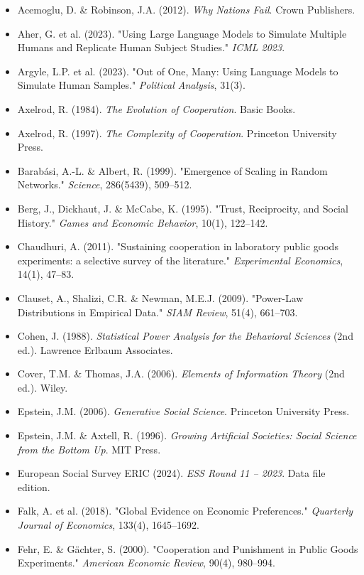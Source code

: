 \begin{itemize}
\item Acemoglu, D. \& Robinson, J.A. (2012). \textit{Why Nations Fail}. Crown Publishers.
\item Aher, G. et al. (2023). "Using Large Language Models to Simulate Multiple Humans and Replicate Human Subject Studies." \textit{ICML 2023}.
\item Argyle, L.P. et al. (2023). "Out of One, Many: Using Language Models to Simulate Human Samples." \textit{Political Analysis}, 31(3).
\item Axelrod, R. (1984). \textit{The Evolution of Cooperation}. Basic Books.
\item Axelrod, R. (1997). \textit{The Complexity of Cooperation}. Princeton University Press.
\item Barabási, A.-L. \& Albert, R. (1999). "Emergence of Scaling in Random Networks." \textit{Science}, 286(5439), 509–512.
\item Berg, J., Dickhaut, J. \& McCabe, K. (1995). "Trust, Reciprocity, and Social History." \textit{Games and Economic Behavior}, 10(1), 122–142.
\item Chaudhuri, A. (2011). "Sustaining cooperation in laboratory public goods experiments: a selective survey of the literature." \textit{Experimental Economics}, 14(1), 47–83.
\item Clauset, A., Shalizi, C.R. \& Newman, M.E.J. (2009). "Power-Law Distributions in Empirical Data." \textit{SIAM Review}, 51(4), 661–703.
\item Cohen, J. (1988). \textit{Statistical Power Analysis for the Behavioral Sciences} (2nd ed.). Lawrence Erlbaum Associates.
\item Cover, T.M. \& Thomas, J.A. (2006). \textit{Elements of Information Theory} (2nd ed.). Wiley.
\item Epstein, J.M. (2006). \textit{Generative Social Science}. Princeton University Press.
\item Epstein, J.M. \& Axtell, R. (1996). \textit{Growing Artificial Societies: Social Science from the Bottom Up}. MIT Press.
\item European Social Survey ERIC (2024). \textit{ESS Round 11 – 2023}. Data file edition.
\item Falk, A. et al. (2018). "Global Evidence on Economic Preferences." \textit{Quarterly Journal of Economics}, 133(4), 1645–1692.
\item Fehr, E. \& Gächter, S. (2000). "Cooperation and Punishment in Public Goods Experiments." \textit{American Economic Review}, 90(4), 980–994.

\end{itemize}
